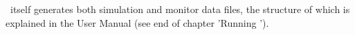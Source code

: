 %
%

\MCX\ itself generates both simulation and monitor data files, the structure of which is explained in the User Manual (see end of chapter 'Running \MCX').

